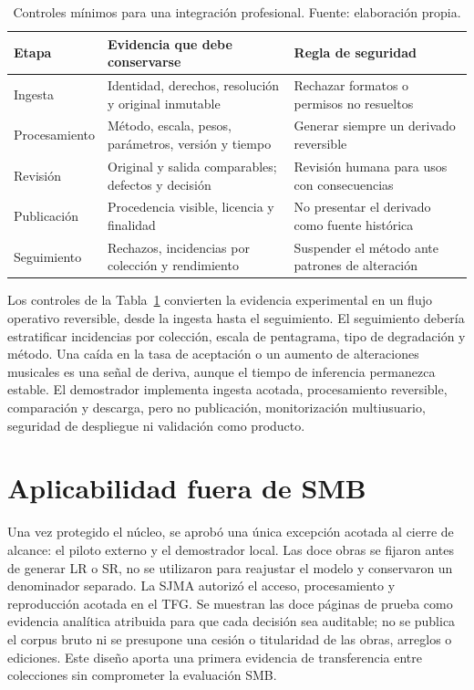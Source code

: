 \begin{table}[htbp]
  \centering
  \small
  \caption{Controles mínimos para una integración profesional. Fuente: elaboración propia.}
  \label{tab:professional-controls}
  \begin{tabular}{p{}p{}p{}}
    \toprule
    Etapa & Evidencia que debe conservarse & Regla de seguridad \\
    \midrule
    Ingesta & Identidad, derechos, resolución y original inmutable & Rechazar formatos o permisos no resueltos \\
    Procesamiento & Método, escala, pesos, parámetros, versión y tiempo & Generar siempre un derivado reversible \\
    Revisión & Original y salida comparables; defectos y decisión & Revisión humana para usos con consecuencias \\
    Publicación & Procedencia visible, licencia y finalidad & No presentar el derivado como fuente histórica \\
    Seguimiento & Rechazos, incidencias por colección y rendimiento & Suspender el método ante patrones de alteración \\
    \bottomrule
  \end{tabular}
\end{table}

Los controles de la Tabla~\ref{tab:professional-controls} convierten la evidencia experimental en
un flujo operativo reversible, desde la ingesta hasta el seguimiento. El seguimiento debería
estratificar incidencias por colección, escala de pentagrama, tipo de
degradación y método. Una caída en la tasa de aceptación o un aumento de alteraciones musicales es
una señal de deriva, aunque el tiempo de inferencia permanezca estable. El demostrador implementa
ingesta acotada, procesamiento reversible, comparación y descarga, pero no publicación,
monitorización multiusuario, seguridad de despliegue ni validación como producto.

\section{Aplicabilidad fuera de SMB}
Una vez protegido el núcleo, se aprobó una única excepción acotada al cierre de alcance: el piloto
externo y el demostrador local. Las doce obras se fijaron antes de generar LR o SR, no se utilizaron
para reajustar el modelo y conservaron un denominador separado. La SJMA autorizó el acceso,
procesamiento y reproducción acotada en el TFG. Se muestran las doce páginas de prueba como
evidencia analítica atribuida para que cada decisión sea auditable; no se publica el corpus bruto ni
se presupone una cesión o titularidad de las obras,
arreglos o ediciones. Este diseño aporta una primera evidencia de transferencia entre colecciones
sin comprometer la evaluación SMB.

